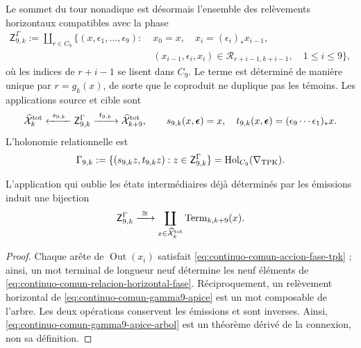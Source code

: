 Le sommet du tour nonadique est désormais l'ensemble des relèvements horizontaux compatibles avec la phase
\begin{equation}
\label{eq:continuo-comun-gamma9-apice}
 \begin{split}
 \mathsf Z^{\Gamma}_{9,k}:=\coprod_{r\in C_9}\bigl\{
 (x,\epsilon_1,\ldots,\epsilon_9):\;&x_0=x,\quad
 x_i=(\epsilon_i)_*x_{i-1},\\
 &(x_{i-1},\epsilon_i,x_i)
 \in\mathscr R_{r+i-1,k+i-1},\quad 1\leq i\leq9
 \bigr\},
 \end{split}
\end{equation}
 où les indices de \(r+i-1\) se lisent dans \(C_9\). Le terme est déterminé de manière unique par \(r=g_k(x)\), de sorte que le coproduit ne duplique pas les témoins. Les applications source et cible sont
\begin{equation}
\label{eq:continuo-comun-gamma9-span}
 \widehat{\mathcal X}^{\rm tot}_k
 \xleftarrow{\ s_{9,k}\ }
 \mathsf Z^{\Gamma}_{9,k}
 \xrightarrow{\ t_{9,k}\ }
 \widehat{\mathcal X}^{\rm tot}_{k+9},
 \qquad
 s_{9,k}(x,\boldsymbol\epsilon)=x,\quad
 t_{9,k}(x,\boldsymbol\epsilon)
 =(\epsilon_9\cdots\epsilon_1)_*x.
\end{equation}
L'holonomie relationnelle est
\begin{equation}
\label{eq:continuo-comun-gamma9-relacion}
 \Gamma_{9,k}:=
 \{(s_{9,k}z,t_{9,k}z):z\in\mathsf Z^{\Gamma}_{9,k}\}
 =\operatorname{Hol}_{C_9}(\nabla_{\rm TPK}).
\end{equation}

\begin{lemma}
\label{lem:continuo-comun-gamma9-arbol}
L'application qui oublie les états intermédiaires déjà déterminés par les émissions induit une bijection
\begin{equation}
\label{eq:continuo-comun-gamma9-apice-arbol}
 \mathsf Z^{\Gamma}_{9,k}
 \xrightarrow{\ \cong\ }
 \coprod_{x\in\widehat{\mathcal X}^{\rm tot}_k}
 \operatorname{Term}_{k,k+9}(x).
\end{equation}
\end{lemma}

\begin{proof}
Chaque arête de \(\operatorname{Out}(x_i)\) satisfait \eqref{eq:continuo-comun-accion-fase-tpk} ; ainsi, un mot terminal de longueur neuf détermine les neuf éléments de \eqref{eq:continuo-comun-relacion-horizontal-fase}. Réciproquement, un relèvement horizontal de \eqref{eq:continuo-comun-gamma9-apice} est un mot composable de l'arbre. Les deux opérations conservent les émissions et sont inverses. Ainsi, \eqref{eq:continuo-comun-gamma9-apice-arbol} est un théorème dérivé de la connexion, non sa définition.
\end{proof}

